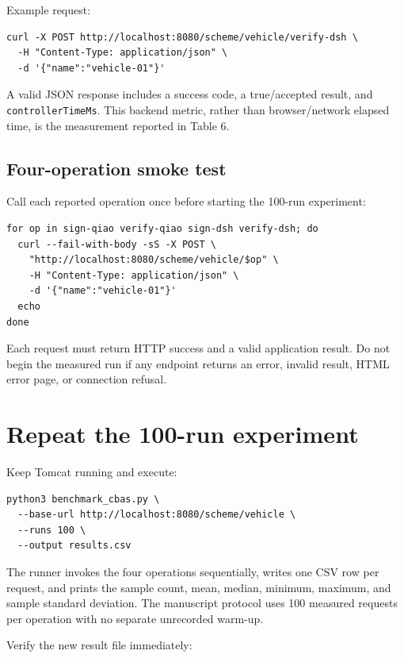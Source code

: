 \documentclass[11pt,a4paper]{article}
\begin{document}
Example request:

\begin{lstlisting}[style=terminal]
curl -X POST http://localhost:8080/scheme/vehicle/verify-dsh \
  -H "Content-Type: application/json" \
  -d '{"name":"vehicle-01"}'
\end{lstlisting}

A valid JSON response includes a success code, a true/accepted result, and \texttt{controllerTimeMs}. This backend metric, rather than browser/network elapsed time, is the measurement reported in Table 6.

\subsection{Four-operation smoke test}

Call each reported operation once before starting the 100-run experiment:

\begin{lstlisting}[style=terminal]
for op in sign-qiao verify-qiao sign-dsh verify-dsh; do
  curl --fail-with-body -sS -X POST \
    "http://localhost:8080/scheme/vehicle/$op" \
    -H "Content-Type: application/json" \
    -d '{"name":"vehicle-01"}'
  echo
done
\end{lstlisting}

Each request must return HTTP success and a valid application result. Do not begin the measured run if any endpoint returns an error, invalid result, HTML error page, or connection refusal.

\section{Repeat the 100-run experiment}

Keep Tomcat running and execute:

\begin{lstlisting}[style=terminal]
python3 benchmark_cbas.py \
  --base-url http://localhost:8080/scheme/vehicle \
  --runs 100 \
  --output results.csv
\end{lstlisting}

The runner invokes the four operations sequentially, writes one CSV row per request, and prints the sample count, mean, median, minimum, maximum, and sample standard deviation. The manuscript protocol uses 100 measured requests per operation with no separate unrecorded warm-up.

Verify the new result file immediately:
\end{document}
